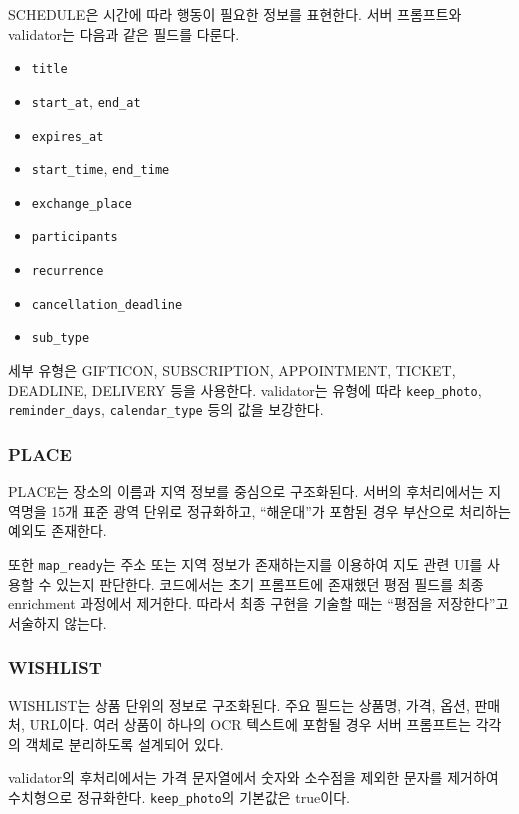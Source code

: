 \documentclass[11pt,a4paper]{article}
\begin{document}
SCHEDULE은 시간에 따라 행동이 필요한 정보를 표현한다. 서버 프롬프트와 validator는 다음과 같은 필드를 다룬다.

\begin{itemize}
    \item \texttt{title}
    \item \texttt{start\_at}, \texttt{end\_at}
    \item \texttt{expires\_at}
    \item \texttt{start\_time}, \texttt{end\_time}
    \item \texttt{exchange\_place}
    \item \texttt{participants}
    \item \texttt{recurrence}
    \item \texttt{cancellation\_deadline}
    \item \texttt{sub\_type}
\end{itemize}

세부 유형은 GIFTICON, SUBSCRIPTION, APPOINTMENT, TICKET, DEADLINE, DELIVERY 등을 사용한다. validator는 유형에 따라 \texttt{keep\_photo}, \texttt{reminder\_days}, \texttt{calendar\_type} 등의 값을 보강한다.

\subsubsection{PLACE}

PLACE는 장소의 이름과 지역 정보를 중심으로 구조화된다. 서버의 후처리에서는 지역명을 15개 표준 광역 단위로 정규화하고, ``해운대''가 포함된 경우 부산으로 처리하는 예외도 존재한다.

또한 \texttt{map\_ready}는 주소 또는 지역 정보가 존재하는지를 이용하여 지도 관련 UI를 사용할 수 있는지 판단한다. 코드에서는 초기 프롬프트에 존재했던 평점 필드를 최종 enrichment 과정에서 제거한다. 따라서 최종 구현을 기술할 때는 ``평점을 저장한다''고 서술하지 않는다.

\subsubsection{WISHLIST}

WISHLIST는 상품 단위의 정보로 구조화된다. 주요 필드는 상품명, 가격, 옵션, 판매처, URL이다. 여러 상품이 하나의 OCR 텍스트에 포함될 경우 서버 프롬프트는 각각의 객체로 분리하도록 설계되어 있다.

validator의 후처리에서는 가격 문자열에서 숫자와 소수점을 제외한 문자를 제거하여 수치형으로 정규화한다. \texttt{keep\_photo}의 기본값은 true이다.
\end{document}
